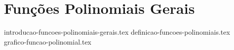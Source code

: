 \section{Funções Polinomiais Gerais}

{introducao-funcoes-polinomiais-gerais.tex}
{definicao-funcoes-polinomiais.tex}
{grafico-funcao-polinomial.tex}